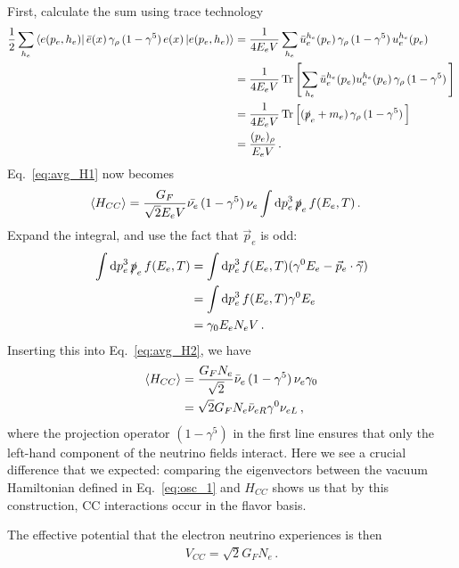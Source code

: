 First, calculate the sum using trace technology
\begin{align}\label{eq:helicity_sum}
    \frac{1}{2} \sum_{h_e} \bra{e(p_e,h_e)} \bar e(x) \,\gamma_\rho\, (1- \gamma^5)\, e(x)   \ket{e(p_e,h_e)} &= \frac{1}{4E_e V} \sum_{h_e} \bar{u}_e^{h_e}(p_e) \,\gamma_\rho\, (1- \gamma^5)\, u_e^{h_e}(p_e) \nonumber \\
    &= \frac{1}{4 E_e V} \Trace{\left[ \sum_{h_e} \bar{u}_e^{h_e}(p_e) u_e^{h_e}(p_e) \,\gamma_\rho\, (1- \gamma^5)\, \right]} \nonumber \\
    &= \frac{1}{4 E_e V} \Trace{\left[ (\slashed{p}_e + m_e ) \,\gamma_\rho\, (1- \gamma^5)\, \right]} \nonumber \\
    &= \frac{(p_e)_\rho}{E_e V}\,.
\end{align}
Eq.~\ref{eq:avg_H1} now becomes 
\begin{align}\label{eq:avg_H2}
    \left\langle {H_{CC}} \right \rangle &= \frac{G_F}{\sqrt{2}E_e V} \bar{\nu_e} \, (1- \gamma^5)\, \nu_e \int \dd p_e^3\, \slashed{p}_e\, f(E_e,T)\,.
\end{align}
Expand the integral, and use the fact that $\vec{p}_e$ is odd:
\begin{align}
    \int \dd p_e^3\, \slashed{p}_e\, f(E_e,T) &= \int \dd p_e^3\, f(E_e,T) (\gamma^0 E_e - \vec{p}_e \cdot \vec{\gamma}) \nonumber \\
                                              &= \int \dd p_e^3\, f(E_e,T) \gamma^0 E_e \nonumber \\
                                              &= \gamma_0 E_e N_e V\,.
\end{align}
Inserting this into Eq.~\ref{eq:avg_H2}, we have
\begin{align}
    \left\langle {H_{CC}} \right \rangle &= \frac{G_F N_e}{\sqrt{2}} \bar{\nu}_e \, (1- \gamma^5)\, \nu_e \gamma_0 \nonumber \\
            &= \sqrt{2}G_F N_e \bar{\nu}_{eR} \gamma^0 \nu_{eL}\,,
\end{align}
where the projection operator $(1- \gamma^5)$ in the first line ensures that only the left-hand component of the neutrino fields interact.
Here we see a crucial difference that we expected: comparing the eigenvectors between the vacuum Hamiltonian defined in Eq.~\ref{eq:osc_1} and $H_{CC}$ shows us 
that by this construction, CC interactions occur in the flavor basis.

The effective 
potential that the electron neutrino experiences is then
\begin{align}\label{eq:V_CC1}
    V_{CC} = \sqrt{2}G_F N_e\,.
\end{align}



